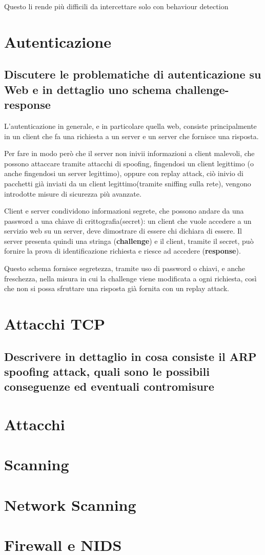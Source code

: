 \documentclass{report}
\begin{document}
\noindent Questo li rende più difficili da intercettare solo con behaviour detection




\chapter{Autenticazione}

\section{Discutere le problematiche di autenticazione su Web e in dettaglio uno schema challenge-response}
\noindent L'autenticazione in generale, e in particolare quella web, consiste principalmente in un client che fa una richiesta a un server e un server che fornisce una risposta.

\noindent Per fare in modo però che il server non inivii informazioni a client malevoli, che possono attaccare tramite attacchi di spoofing,
fingendosi un client legittimo (o anche fingendosi un server legittimo), oppure con replay attack, ciò inivio di pacchetti già inviati da un client legittimo(tramite 
sniffing sulla rete), vengono introdotte misure di sicurezza più avanzate.

\noindent Client e server condividono informazioni segrete, che possono andare da una password a una chiave di crittografia(secret):
un client che vuole accedere a un servizio web su un server, deve dimostrare di essere chi dichiara di essere. Il server presenta quindi 
una stringa (\textbf{challenge}) e il client, tramite il secret, può fornire la prova di identificazione richiesta e riesce ad accedere (\textbf{response}).

\noindent Questo schema fornisce segretezza, tramite uso di password o chiavi, e anche freschezza, nella misura in cui la challenge viene modificata a ogni richiesta, così
che non si possa sfruttare una risposta già fornita con un replay attack.


\chapter{Attacchi TCP}

\section{Descrivere in dettaglio in cosa consiste il ARP spoofing attack, quali sono le possibili conseguenze ed eventuali contromisure}




\chapter{Attacchi}




\chapter{Scanning}



\chapter{Network Scanning}





\chapter{Firewall e NIDS}
\end{document}
